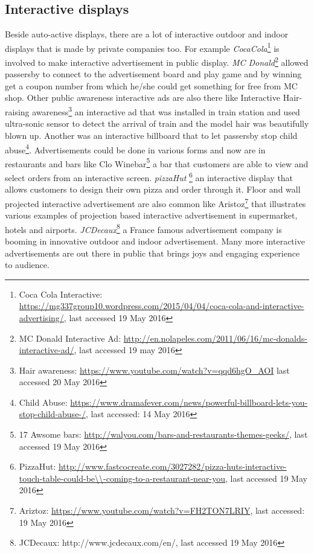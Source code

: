 \subsection{Interactive displays}
Beside auto-active displays, there are a lot of interactive outdoor and indoor displays that is made by private companies too. For example  \emph{CocaCola}\footnote{Coca Cola Interactive: \url{https://mg337group10.wordpress.com/2015/04/04/coca-cola-and-interactive-advertising/}, last accessed 19 May 2016} is involved to make interactive advertisement in public display. \emph{MC Donald}\footnote{MC Donald Interactive Ad: \url{http://en.nolapeles.com/2011/06/16/mc-donalds-interactive-ad/}, last accessed 19 may 2016} allowed passersby to connect to the advertisement board and play game and by winning get a coupon number from which he/she could get something for free from MC shop. Other public awareness interactive ads are also there like Interactive Hair-raising awareness\footnote{Hair awareness: \url{https://www.youtube.com/watch?v=qqd6hgO_AOI} last accessed 20 May 2016} an interactive ad that was installed in train station and used ultra-sonic sensor to detect the arrival of train and the model hair was beautifully blown up. Another was an interactive billboard that to let passersby stop child abuse\footnote{Child Abuse: \url{https://www.dramafever.com/news/powerful-billboard-lets-you-stop-child-abuse-/}, last accessed: 14 May 2016}. Advertisements could be done in various forms and now are in restaurants and bars like Clo Winebar\footnote{17 Awsome bars: \url{http://walyou.com/bars-and-restaurants-themes-geeks/}, last accessed 19 May 2016} a bar that customers are able to view and select orders from an interactive screen. \emph{pizzaHut} \footnote{PizzaHut: \url{http://www.fastcocreate.com/3027282/pizza-huts-interactive-touch-table-could-be\\-coming-to-a-restaurant-near-you}, last accessed 19 May 2016} an interactive display that allows customers to design their own pizza and order through it. Floor and wall projected interactive advertisement are also common like Aristoz\footnote{Ariztoz: \url{https://www.youtube.com/watch?v=FH2TON7LRIY}, last accessed: 19 May 2016} that illustrates various examples of projection based interactive advertisement in supermarket, hotels and airports. \emph{JCDecaux}\footnote{JCDecaux: http://www.jcdecaux.com/en/, last accessed 19 May 2016} a France famous advertisement company is booming in innovative outdoor and indoor advertisement. Many more interactive advertisements are out there in public that brings joys and engaging experience to audience.  


